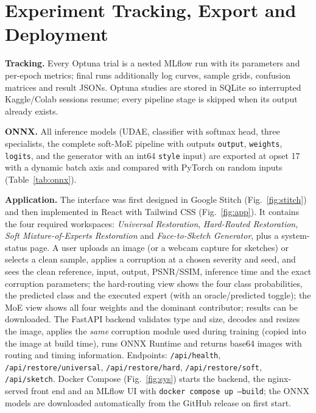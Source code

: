 \documentclass[conference]{IEEEtran}
\newcommand{\inputif}[1]{\IfFileExists{generated/#1}{}{\textit{[table \detokenize{#1} pending]}}}
\begin{document}
\section{Experiment Tracking, Export and Deployment}
\textbf{Tracking.} Every Optuna trial is a nested MLflow run with its parameters and per-epoch metrics; final runs additionally log curves, sample grids, confusion matrices and result JSONs. Optuna studies are stored in SQLite so interrupted Kaggle/Colab sessions resume; every pipeline stage is skipped when its output already exists.

\textbf{ONNX.} All inference models (UDAE, classifier with softmax head, three specialists, the complete soft-MoE pipeline with outputs \texttt{output}, \texttt{weights}, \texttt{logits}, and the generator with an int64 \texttt{style} input) are exported at opset 17 with a dynamic batch axis and compared with PyTorch on random inputs (Table~\ref{tab:onnx}).

\inputif{onnx.tex}

\textbf{Application.} The interface was first designed in Google Stitch (Fig.~\ref{fig:stitch}) and then implemented in React with Tailwind CSS (Fig.~\ref{fig:app}). It contains the four required workspaces: \emph{Universal Restoration}, \emph{Hard-Routed Restoration}, \emph{Soft Mixture-of-Experts Restoration} and \emph{Face-to-Sketch Generator}, plus a system-status page. A user uploads an image (or a webcam capture for sketches) or selects a clean sample, applies a corruption at a chosen severity and seed, and sees the clean reference, input, output, PSNR/SSIM, inference time and the exact corruption parameters; the hard-routing view shows the four class probabilities, the predicted class and the executed expert (with an oracle/predicted toggle); the MoE view shows all four weights and the dominant contributor; results can be downloaded. The FastAPI backend validates type and size, decodes and resizes the image, applies the \emph{same} corruption module used during training (copied into the image at build time), runs ONNX Runtime and returns base64 images with routing and timing information. Endpoints: \texttt{/api/health}, \texttt{/api/restore/universal}, \texttt{/api/restore/hard}, \texttt{/api/restore/soft}, \texttt{/api/sketch}. Docker Compose (Fig.~\ref{fig:sys}) starts the backend, the nginx-served front end and an MLflow UI with \texttt{docker compose up --build}; the ONNX models are downloaded automatically from the GitHub release on first start.
\end{document}

